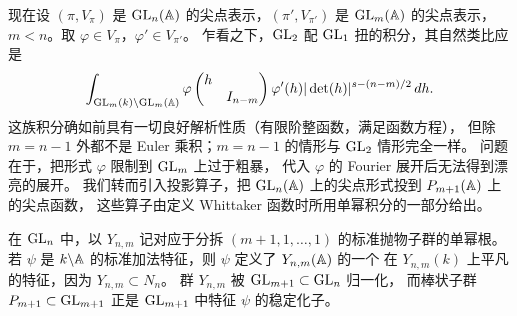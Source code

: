 现在设 $(\pi,V_\pi)$ 是 $\mathrm{GL}_n(\mathbb{A})$ 的尖点表示，$(\pi',V_{\pi'})$ 是
$\mathrm{GL}_m(\mathbb{A})$ 的尖点表示，$m<n$。取 $\varphi\in V_\pi$，$\varphi'\in V_{\pi'}$。
乍看之下，$\mathrm{GL}_2$ 配 $\mathrm{GL}_1$ 扭的积分，其自然类比应是
\[
\int_{\mathrm{GL}_m(k)\backslash\mathrm{GL}_m(\mathbb{A})}
\varphi\begin{pmatrix}h&\\&I_{n-m}\end{pmatrix}\varphi'(h)|\det(h)|^{s-(n-m)/2}\,dh.
\]
这族积分确如前具有一切良好解析性质（有限阶整函数，满足函数方程），
但除 $m=n-1$ 外都不是 Euler 乘积；$m=n-1$ 的情形与 $\mathrm{GL}_2$ 情形完全一样。
问题在于，把形式 $\varphi$ 限制到 $\mathrm{GL}_m$ 上过于粗暴，
代入 $\varphi$ 的 Fourier 展开后无法得到漂亮的展开。
我们转而引入投影算子，把 $\mathrm{GL}_n(\mathbb{A})$ 上的尖点形式投到 $P_{m+1}(\mathbb{A})$ 上的尖点函数，
这些算子由定义 Whittaker 函数时所用单幂积分的一部分给出。

在 $\mathrm{GL}_n$ 中，以 $Y_{n,m}$ 记对应于分拆 $(m+1,1,\ldots,1)$ 的标准抛物子群的单幂根。
若 $\psi$ 是 $k\backslash\mathbb{A}$ 的标准加法特征，则 $\psi$ 定义了 $Y_{n,m}(\mathbb{A})$ 的一个
在 $Y_{n,m}(k)$ 上平凡的特征，因为 $Y_{n,m}\subset N_n$。
群 $Y_{n,m}$ 被 $\mathrm{GL}_{m+1}\subset\mathrm{GL}_n$ 归一化，
而棒状子群 $P_{m+1}\subset\mathrm{GL}_{m+1}$ 正是 $\mathrm{GL}_{m+1}$ 中特征 $\psi$ 的稳定化子。

